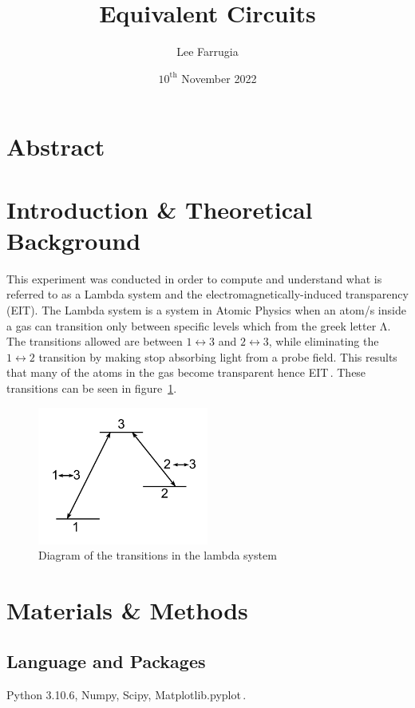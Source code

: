 \documentclass[12pt, a4paper]{article}
\title{Equivalent Circuits}
\date{\(10^\mathrm{{th}}\) November 2022}
\author{Lee Farrugia}
\begin{document}
\maketitle
\thispagestyle{titlepagestyle}
\pagestyle{mystyle}

\section*{Abstract}

\section{Introduction \& Theoretical Background}
This experiment was conducted in order to compute and understand what is referred to as a Lambda system and the electromagnetically-induced transparency (EIT). The Lambda system is a system in Atomic Physics when an atom/s inside a gas can transition only between specific levels which from the greek letter \(\mathrm{\Lambda}\). The transitions allowed are between \(1 \leftrightarrow 3\) and \(2 \leftrightarrow 3\), while eliminating the \(1 \leftrightarrow 2\) transition by making stop absorbing light from a probe field. This results that many of the atoms in the gas become transparent hence EIT\,. These transitions can be seen in figure~\ref{fig:Transition_Diagram}.

\begin{figure}[H]
  \centering
  \includegraphics[width=0.5\textwidth]{Transition Diagram.png}\caption{Diagram of the transitions in the lambda system}\label{fig:Transition_Diagram}
\end{figure}

\section{Materials \& Methods}
  \subsection{Language and Packages}
    Python 3.10.6, Numpy, Scipy, Matplotlib.pyplot\,.
\end{document}

